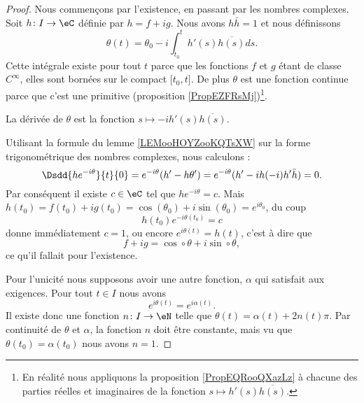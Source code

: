 \begin{proof}
    Nous commençons par l'existence, en passant par les nombres complexes. Soit \( h\colon I\to \eC\) définie par \( h=f+ig\). Nous avons \( h\bar h=1\) et nous définissons
    \begin{equation}
        \theta(t)=\theta_0-i\int_{t_0}^th'(s)\overline{ h(s) }ds.
    \end{equation}
    Cette intégrale existe pour tout \( t\) parce que les fonctions \( f\) et \( g\) étant de classe \(  C^{\infty}\), elles sont bornées sur le compact \( \mathopen[ t_0 , t  \mathclose]\). De plus \( \theta\) est une fonction continue parce que c'est une primitive (proposition \ref{PropEZFRsMj})\footnote{En réalité nous appliquons la proposition \ref{PropEQRooQXazLz} à chacune des parties réelles et imaginaires de la fonction \( s\mapsto h'(s)\overline{ h(s) }\).}.

    La dérivée de \( \theta\) est la fonction \( s\mapsto -i h'(s)\overline{ h(s) }\).

    Utilisant la formule du lemme \ref{LEMooHOYZooKQTsXW} sur la forme trigonométrique des nombres complexes, nous calculons :
    \begin{equation}
        \Dsdd{ h e^{-i\theta} }{t}{0}= e^{-i\theta}(h'-h\theta')= e^{-i\theta}(h'-ih(-i)h'\bar h)=0.
    \end{equation}
    Par conséquent il existe \( c\in \eC\) tel que \( h e^{-i\theta}=c\). Mais \( h(t_0)=f(t_0)+ig(t_0)=\cos(\theta_0)+i\sin(\theta_0)= e^{i\theta_0}\), du coup
    \begin{equation}
        h(t_0) e^{-i\theta(t_0)}=c
    \end{equation}
    donne immédiatement \( c=1\), ou encore \(  e^{i\theta(t)}=h(t)\), c'est à dire que
    \begin{equation}
        f+ig=\cos\circ\theta+i\sin\circ\theta,
    \end{equation}
    ce qu'il fallait pour l'existence.

    Pour l'unicité nous supposons avoir une autre fonction, \(\alpha\) qui satisfait aux exigences. Pour tout \( t\in I\) nous avons
    \begin{equation}
        e^{i\theta(t)}= e^{i\alpha(t)}.
    \end{equation}
    Il existe donc une fonction \( n\colon I\to \eN\) telle que \( \theta(t)=\alpha(t)+2n(t)\pi\). Par continuité de \( \theta\) et \( \alpha\), la fonction \( n\) doit être constante, mais vu que \( \theta(t_0)=\alpha(t_0)\) nous avons \( n=1\).
\end{proof}


